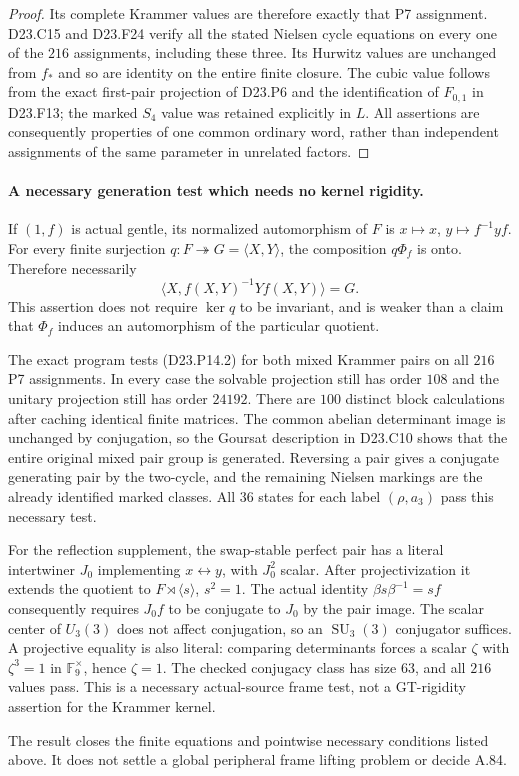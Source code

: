 \begin{proof}
Its complete Krammer values are therefore exactly that P7
assignment. D23.C15 and D23.F24 verify all the stated Nielsen
cycle equations on every one of the $216$ assignments,
including these three. Its Hurwitz values are unchanged from
$f_*$ and so are identity on the entire finite closure.
The cubic value follows from the exact first-pair projection
of D23.P6 and the identification of $F_{0,1}$ in D23.F13;
the marked $S_4$ value was retained explicitly in $L$.
All assertions are consequently properties of one common
ordinary word, rather than independent assignments of the
same parameter in unrelated factors.
\end{proof}

\paragraph{A necessary generation test which needs no kernel rigidity.}
If $(1,f)$ is actual gentle, its normalized automorphism of
$F$ is $x\mapsto x$, $y\mapsto f^{-1}yf$. For every finite
surjection $q:F\twoheadrightarrow G=\langle X,Y\rangle$,
the composition $q\Phi_f$ is onto. Therefore necessarily
\[
                    \langle X,f(X,Y)^{-1}Yf(X,Y)\rangle=G.
\tag{D23.P14.2}
\]
This assertion does not require $\ker q$ to be invariant,
and is weaker than a claim that $\Phi_f$ induces an automorphism
of the particular quotient.

The exact program  tests
(D23.P14.2) for both mixed Krammer pairs on all $216$ P7
assignments. In every case the solvable projection still has
order $108$ and the unitary projection still has order $24192$.
There are $100$ distinct block calculations after caching
identical finite matrices. The common abelian determinant
image is unchanged by conjugation, so the Goursat description
in D23.C10 shows that the entire original mixed pair group
is generated. Reversing a pair gives a conjugate generating
pair by the two-cycle, and the remaining Nielsen markings
are the already identified marked classes. All $36$ states
for each label $(\rho,a_3)$ pass this necessary test.

For the reflection supplement, the swap-stable perfect pair
has a literal intertwiner $J_0$ implementing $x\leftrightarrow y$,
with $J_0^2$ scalar. After projectivization it extends the
quotient to $F\rtimes\langle s\rangle$, $s^2=1$. The actual
identity $\beta s\beta^{-1}=sf$ consequently requires
$J_0f$ to be conjugate to $J_0$ by the pair image. The scalar
center of $U_3(3)$ does not affect conjugation, so an
$\operatorname{SU}_3(3)$ conjugator suffices. A projective
equality is also literal: comparing determinants forces a
scalar $\zeta$ with $\zeta^3=1$ in $\mathbb F_9^\times$, hence
$\zeta=1$. The checked conjugacy class has size $63$, and
all $216$ values pass. This is a necessary actual-source
frame test, not a GT-rigidity assertion for the Krammer kernel.

The result closes the finite equations and pointwise necessary
conditions listed above. It does not settle a global peripheral
frame lifting problem or decide A.84.
